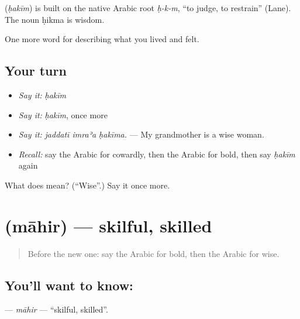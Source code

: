 \begin{cousinweb}
\textbf{} (\emph{ḥakīm}) is built on the native Arabic root \emph{ḥ-k-m}, \textquotedblleft{}to judge, to restrain\textquotedblright{} (Lane). The noun ḥikma is wisdom.
\end{cousinweb}

\begin{grammarlens}[title={What you've built}]
One more word for describing what you lived and felt.
\end{grammarlens}

\subsection*{Your turn}
\begin{itemize}
\raggedright
  \item \emph{Say it:} \emph{ḥakīm}
  \item \emph{Say it:} \emph{ḥakīm}, once more
  \item \emph{Say it:} \emph{jaddatī imraʾa ḥakīma.} — My grandmother is a wise woman.
  \item \emph{Recall:} say the Arabic for cowardly, then the Arabic for bold, then say \emph{ḥakīm} again
\end{itemize}

\begin{tcolorbox}[breakable,colback=teal!4,colframe=teal!35!black,title={Before you move on}]
What does  mean? (\textquotedblleft{}Wise\textquotedblright{}.) Say it once more.
\end{tcolorbox}
\section[\texorpdfstring{\ar{ماهر} (māhir)}{ماهر (māhir)}]{ (māhir) — skilful, skilled}

\label{lesson:AR-C501-mahir}



\begin{quote}
Before the new one: say the Arabic for bold, then the Arabic for wise.
\end{quote}

\subsection*{You'll want to know: }
\textbf{} — \emph{māhir} — \textquotedblleft{}skilful, skilled\textquotedblright{}.


